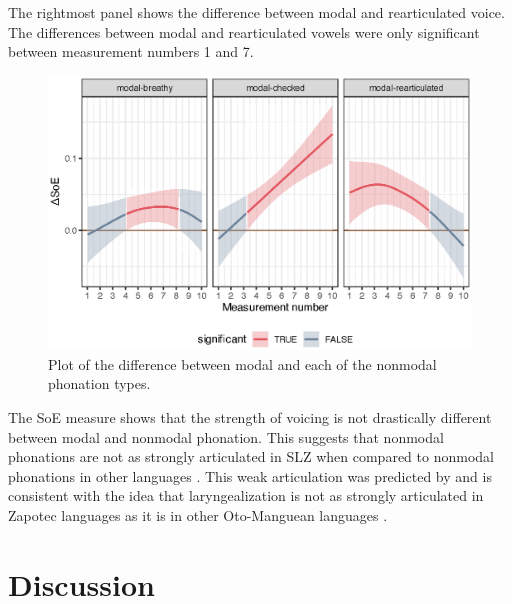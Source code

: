 The rightmost panel shows the difference between modal and rearticulated voice. The differences between modal and rearticulated vowels were only significant between measurement numbers 1 and 7. 

\begin{figure}[h!]
    \centering
    \includegraphics[width = \linewidth]{images/LCH_GAMMs/soe_model_diff.eps}
    \caption{Plot of the difference between modal and each of the nonmodal phonation types.}
    \label{fig:soe_model_diff}
\end{figure}

The SoE measure shows that the strength of voicing is not drastically different between modal and nonmodal phonation. This suggests that nonmodal phonations are not as strongly articulated in SLZ when compared to nonmodal phonations in other languages \citep[e.g.,][]{garellekVoicingGlottalConsonants2021,garellekMarginsPhonologyPhonetics2025,wellerInteractionsToneGlottalization2023,wellerLexicalToneVowel2023,wellerVoiceQualityTone2024}. This weak articulation was predicted by \citeauthor{silvermanLaryngealComplexityOtomanguean1997} and is consistent with the idea that laryngealization is not as strongly articulated in Zapotec languages as it is in other Oto-Manguean languages \citep{herrerazendejasAmuzgoZapotecTwo2000}.

\section{Discussion}\label{sec:discussion_of_lc}

